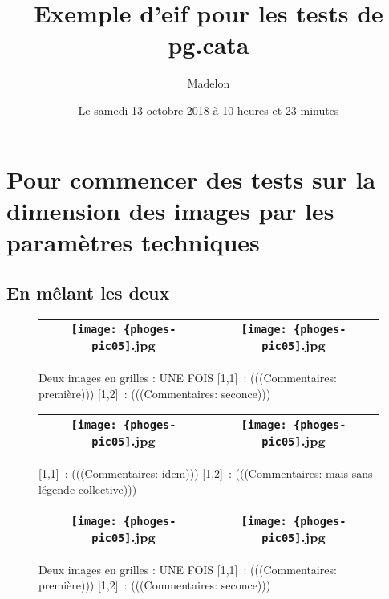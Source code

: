 \documentclass[12pt,twocolumn,french]{article}
\begin{document}
\title{Exemple d'eif pour les tests de pg.cata}
\author{Madelon}
\date{Le samedi 13 octobre 2018 à 10 heures et 23 minutes}
\maketitle
\tableofcontents
\newpage

%
\section{Pour commencer des tests sur la dimension des images par les paramètres techniques}
%
%
\subsection{En mêlant les deux}
%

  \begin{figure}[H]
    \caption{
      Deux images en grilles : UNE FOIS
      [1,1]~: 
      (((Commentaires: première)))
      [1,2]~: 
      (((Commentaires: seconce)))
    }
    \vspace{4mm}
    \label{phoges-pic05.jpg}
    \noindent \centering{}
    \begin{tabular}{|c|c|}
      \hline
          \texttt{[image: \{phoges-pic05]}.jpg}
        &
          \texttt{[image: \{phoges-pic05]}.jpg}
        \tabularnewline \hline
    \end{tabular}
  \end{figure}

  \begin{figure}[H]
    \caption{
      [1,1]~: 
      (((Commentaires: idem)))
      [1,2]~: 
      (((Commentaires: mais sans légende collective)))
    }
    \vspace{4mm}
    \label{phoges-pic05.jpg}
    \noindent \centering{}
    \begin{tabular}{|c|c|}
      \hline
          \texttt{[image: \{phoges-pic05]}.jpg}
        &
          \texttt{[image: \{phoges-pic05]}.jpg}
        \tabularnewline \hline
    \end{tabular}
  \end{figure}

  \begin{figure}[H]
    \caption{
      Deux images en grilles : UNE FOIS
      [1,1]~: 
      (((Commentaires: première)))
      [1,2]~: 
      (((Commentaires: seconce)))
    }
    \vspace{4mm}
    \label{phoges-pic05.jpg}
    \noindent \centering{}
    \begin{tabular}{|c|c|}
      \hline
          \texttt{[image: \{phoges-pic05]}.jpg}
        &
          \texttt{[image: \{phoges-pic05]}.jpg}
        \tabularnewline \hline
    \end{tabular}
  \end{figure}
\end{document}

